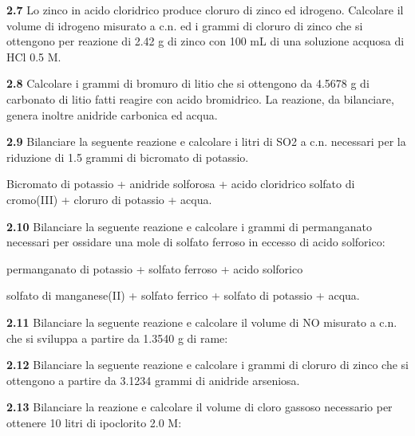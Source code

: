 \vspace{0.2cm}\textbf{2.7} Lo zinco in acido cloridrico produce cloruro di zinco ed idrogeno. Calcolare il volume di
idrogeno misurato a c.n. ed i grammi di cloruro di zinco che si ottengono per reazione di 2.42 g di
zinco con 100 mL di una soluzione acquosa di HCl 0.5 M.

\vspace{0.2cm}\textbf{2.8} Calcolare i grammi di bromuro di litio che si ottengono da 4.5678 g di carbonato di litio fatti
reagire con acido bromidrico. La reazione, da bilanciare, genera inoltre anidride carbonica ed acqua.

\vspace{0.2cm}\textbf{2.9} Bilanciare la seguente reazione e calcolare i litri di SO2 a c.n. necessari per la riduzione di 1.5
grammi di bicromato di potassio.

Bicromato di potassio + anidride solforosa + acido cloridrico \ce{->} solfato di cromo(III) + cloruro di
potassio + acqua.

\vspace{0.2cm}\textbf{2.10} Bilanciare la seguente reazione e calcolare i grammi di permanganato necessari per ossidare una
mole di solfato ferroso in eccesso di acido solforico:

\begin{center}
permanganato di potassio + solfato ferroso + acido solforico \ce{->}

\ce{->}solfato di manganese(II) + solfato ferrico + solfato di potassio + acqua.
\end{center}

\vspace{0.2cm}\textbf{2.11} Bilanciare la seguente reazione e calcolare il volume di NO misurato a c.n. che si sviluppa a
partire da 1.3540 g di rame:

\begin{center}
\end{center}

\vspace{0.2cm}\textbf{2.12} Bilanciare la seguente reazione e calcolare i grammi di cloruro di zinco che si ottengono a partire da 3.1234 grammi di anidride arseniosa.

\begin{center}
\end{center}

\vspace{0.2cm}\textbf{2.13} Bilanciare la reazione e calcolare il volume di cloro gassoso necessario per ottenere 10 litri di ipoclorito 2.0 M:

